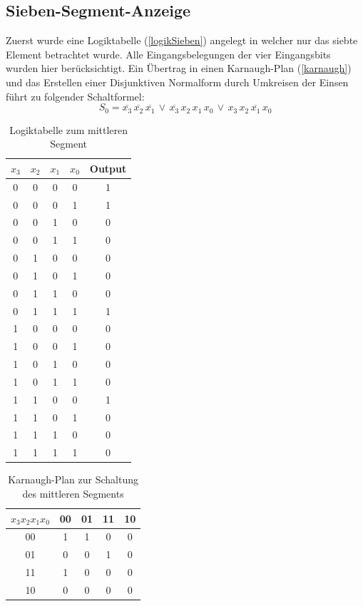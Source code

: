 \documentclass[11pt, a4paper]{article}
\begin{document}
\newpage
\subsection*{Sieben-Segment-Anzeige}
Zuerst wurde eine Logiktabelle (\autoref{logikSieben}) angelegt in welcher nur das siebte Element betrachtet wurde. Alle Eingangsbelegungen der vier Eingangsbits wurden hier berücksichtigt. Ein Übertrag in einen Karnaugh-Plan (\autoref{karnaugh}) und das Erstellen einer Disjunktiven Normalform durch Umkreisen der Einsen führt zu folgender Schaltformel:
$$S_0 = \overline{x_3}\,\overline{x_2}\,\overline{x_1}\,\lor\,\overline{x_3}\,x_2\,x_1\,x_0\,\lor\,x_3\,x_2\,\overline{x_1}\,x_0$$
\begin{table}[H]
	\center
	\begin{tabular}{c|c|c|c||c}
	$x_3$ &  $x_2$ & $x_1$ & $x_0$ & Output	\\ \hline
	0 & 0 & 0 & 0 & 1 \\ \hline	
	0 & 0 & 0 & 1 & 1 \\ \hline
	0 & 0 & 1 & 0 & 0 \\ \hline
	0 & 0 & 1 & 1 & 0 \\ \hline
	0 & 1 & 0 & 0 & 0 \\ \hline
	0 & 1 & 0 & 1 & 0 \\ \hline
	0 & 1 & 1 & 0 & 0 \\ \hline
	0 & 1 & 1 & 1 & 1 \\ \hline
	1 & 0 & 0 & 0 & 0 \\ \hline	
	1 & 0 & 0 & 1 & 0 \\ \hline	
	1 & 0 & 1 & 0 & 0 \\ \hline	
	1 & 0 & 1 & 1 & 0 \\ \hline	
	1 & 1 & 0 & 0 & 1 \\ \hline	
	1 & 1 & 0 & 1 & 0 \\ \hline	
	1 & 1 & 1 & 0 & 0 \\ \hline	
	1 & 1 & 1 & 1 & 0 \\ \hline	
	\end{tabular}
	\caption{Logiktabelle zum mittleren Segment}
	\label{logikSieben}
\end{table}
\begin{table}[H]
	\center
	\begin{tabular}{c||c|c|c|c}
	$x_3 x_2 x_1 x_0$ 	& 00 & 01 & 11 & 10	\\ \hline \hline
	00 & 1 & 1 & 0 & 0 \\ \hline
	01 & 0 & 0 & 1 & 0 \\ \hline
	11 & 1 & 0 & 0 & 0 \\ \hline
	10 & 0 & 0 & 0 & 0 \\ \hline
	\end{tabular}
	\caption{Karnaugh-Plan zur Schaltung des mittleren Segments}
	\label{karnaugh}
\end{table}
\end{document}
